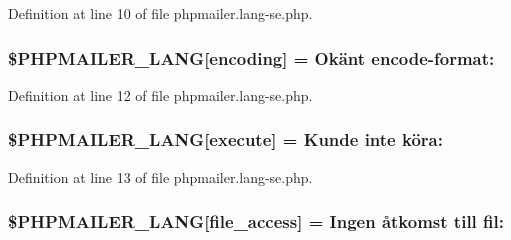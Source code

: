 Definition at line 10 of file phpmailer.\+lang-\/se.\+php.

\subsubsection[{\texorpdfstring{\$\+P\+H\+P\+M\+A\+I\+L\+E\+R\+\_\+\+L\+A\+NG}{$PHPMAILER_LANG}}]{\setlength{\rightskip}{0pt plus 5cm}\$P\+H\+P\+M\+A\+I\+L\+E\+R\+\_\+\+L\+A\+NG\mbox{[}\textquotesingle{}encoding\textquotesingle{}\mbox{]} = \textquotesingle{}Okänt encode-\/format\+: \textquotesingle{}}\hypertarget{phpmailer_8lang-se_8php_a817f7283f3d54c970a0c10305cc668cc}{}\label{phpmailer_8lang-se_8php_a817f7283f3d54c970a0c10305cc668cc}


Definition at line 12 of file phpmailer.\+lang-\/se.\+php.

\subsubsection[{\texorpdfstring{\$\+P\+H\+P\+M\+A\+I\+L\+E\+R\+\_\+\+L\+A\+NG}{$PHPMAILER_LANG}}]{\setlength{\rightskip}{0pt plus 5cm}\$P\+H\+P\+M\+A\+I\+L\+E\+R\+\_\+\+L\+A\+NG\mbox{[}\textquotesingle{}execute\textquotesingle{}\mbox{]} = \textquotesingle{}Kunde inte köra\+: \textquotesingle{}}\hypertarget{phpmailer_8lang-se_8php_a668217a9563a168f30f2a8548b6ed5a9}{}\label{phpmailer_8lang-se_8php_a668217a9563a168f30f2a8548b6ed5a9}


Definition at line 13 of file phpmailer.\+lang-\/se.\+php.

\subsubsection[{\texorpdfstring{\$\+P\+H\+P\+M\+A\+I\+L\+E\+R\+\_\+\+L\+A\+NG}{$PHPMAILER_LANG}}]{\setlength{\rightskip}{0pt plus 5cm}\$P\+H\+P\+M\+A\+I\+L\+E\+R\+\_\+\+L\+A\+NG\mbox{[}\textquotesingle{}file\+\_\+access\textquotesingle{}\mbox{]} = \textquotesingle{}Ingen åtkomst till fil\+: \textquotesingle{}}\hypertarget{phpmailer_8lang-se_8php_a7e83349023b856ef9e5c46e30ae6d51e}{}\label{phpmailer_8lang-se_8php_a7e83349023b856ef9e5c46e30ae6d51e}


